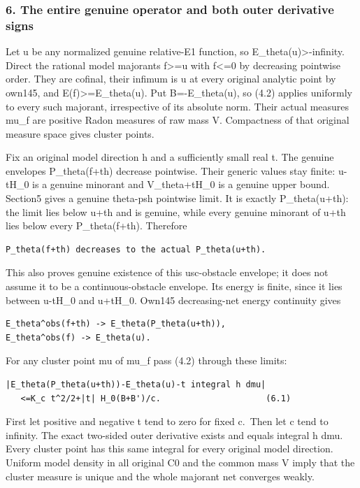 \documentclass[
  10pt,
]{article}
\begin{document}
\subsubsection{6. The entire genuine operator and both outer derivative
signs}\label{the-entire-genuine-operator-and-both-outer-derivative-signs}

Let u be any normalized genuine relative-E1 function, so
E\_theta(u)\textgreater-infinity. Direct the rational model majorants
f\textgreater=u with f\textless=0 by decreasing pointwise order. They
are cofinal, their infimum is u at every original analytic point by
own145, and E(f)\textgreater=E\_theta(u). Put B=-E\_theta(u), so (4.2)
applies uniformly to every such majorant, irrespective of its absolute
norm. Their actual measures mu\_f are positive Radon measures of raw
mass V. Compactness of that original measure space gives cluster points.

Fix an original model direction h and a sufficiently small real t. The
genuine envelopes P\_theta(f+th) decrease pointwise. Their generic
values stay finite: u-\textbar t\textbar H\_0 is a genuine minorant and
V\_theta+\textbar t\textbar H\_0 is a genuine upper bound. Section5
gives a genuine theta-psh pointwise limit. It is exactly P\_theta(u+th):
the limit lies below u+th and is genuine, while every genuine minorant
of u+th lies below every P\_theta(f+th). Therefore

\begin{verbatim}
P_theta(f+th) decreases to the actual P_theta(u+th).
\end{verbatim}

This also proves genuine existence of this usc-obstacle envelope; it
does not assume it to be a continuous-obstacle envelope. Its energy is
finite, since it lies between u-\textbar t\textbar H\_0 and
u+\textbar t\textbar H\_0. Own145 decreasing-net energy continuity gives

\begin{verbatim}
E_theta^obs(f+th) -> E_theta(P_theta(u+th)),
E_theta^obs(f) -> E_theta(u).
\end{verbatim}

For any cluster point mu of mu\_f pass (4.2) through these limits:

\begin{verbatim}
|E_theta(P_theta(u+th))-E_theta(u)-t integral h dmu|
   <=K_c t^2/2+|t| H_0(B+B')/c.                     (6.1)
\end{verbatim}

First let positive and negative t tend to zero for fixed c.~Then let c
tend to infinity. The exact two-sided outer derivative exists and equals
integral h dmu. Every cluster point has this same integral for every
original model direction. Uniform model density in all original C0 and
the common mass V imply that the cluster measure is unique and the whole
majorant net converges weakly.
\end{document}
